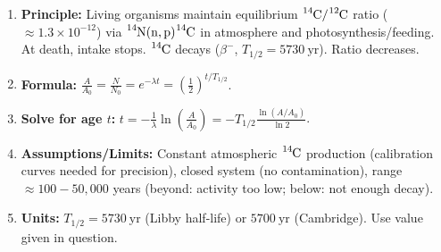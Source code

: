 \documentclass[11pt]{article}
\begin{document}
\begin{methode}
\begin{enumerate}
\item \textbf{Principle:} Living organisms maintain equilibrium $\ce{^{14}C}/\ce{^{12}C}$ ratio ($\approx 1.3 \times 10^{-12}$) via $\ce{^{14}N(n,p)^{14}C}$ in atmosphere and photosynthesis/feeding. At death, intake stops. $\ce{^{14}C}$ decays ($\beta^-$, $T_{1/2} = 5730\ \text{yr}$). Ratio decreases.
\item \textbf{Formula:} $\frac{A}{A_0} = \frac{N}{N_0} = e^{-\lambda t} = \left(\frac{1}{2}\right)^{t/T_{1/2}}$.
\item \textbf{Solve for age $t$:} $t = -\frac{1}{\lambda} \ln\left(\frac{A}{A_0}\right) = -T_{1/2} \frac{\ln(A/A_0)}{\ln 2}$.
\item \textbf{Assumptions/Limits:} Constant atmospheric $\ce{^{14}C}$ production (calibration curves needed for precision), closed system (no contamination), range $\approx 100 - 50,000$ years (beyond: activity too low; below: not enough decay).
\item \textbf{Units:} $T_{1/2} = 5730\ \text{yr}$ (Libby half-life) or $5700\ \text{yr}$ (Cambridge). Use value given in question.
\end{enumerate}
\end{methode}
\end{document}
